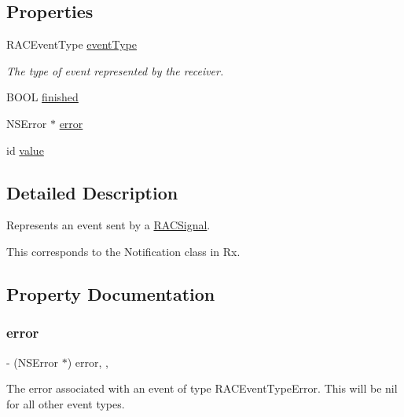 \subsection*{Properties}
\begin{DoxyCompactItemize}
\item 
\mbox{\label{interface_r_a_c_event_a627ce9729e9d997781513e3dbbbbd428}} 
R\+A\+C\+Event\+Type \mbox{\hyperlink{interface_r_a_c_event_a627ce9729e9d997781513e3dbbbbd428}{event\+Type}}
\begin{DoxyCompactList}\small\item\em The type of event represented by the receiver. \end{DoxyCompactList}\item 
B\+O\+OL \mbox{\hyperlink{interface_r_a_c_event_a01397b7a7fa92bfd6fbda712947eae57}{finished}}
\item 
N\+S\+Error $\ast$ \mbox{\hyperlink{interface_r_a_c_event_a064841141e315a1770ccb3e5f1534327}{error}}
\item 
id \mbox{\hyperlink{interface_r_a_c_event_a82805c6e95ad056979f593a90addb86a}{value}}
\end{DoxyCompactItemize}


\subsection{Detailed Description}
Represents an event sent by a \mbox{\hyperlink{interface_r_a_c_signal}{R\+A\+C\+Signal}}.

This corresponds to the {\ttfamily Notification} class in Rx. 

\subsection{Property Documentation}
\mbox{\label{interface_r_a_c_event_a064841141e315a1770ccb3e5f1534327}} 
\subsubsection{\texorpdfstring{error}{error}}
{\footnotesize\ttfamily -\/ (N\+S\+Error $\ast$) error\hspace{0.3cm}{\ttfamily [read]}, {\ttfamily [nonatomic]}, {\ttfamily [strong]}}

The error associated with an event of type R\+A\+C\+Event\+Type\+Error. This will be nil for all other event types. \mbox{\label{interface_r_a_c_event_a01397b7a7fa92bfd6fbda712947eae57}} 
